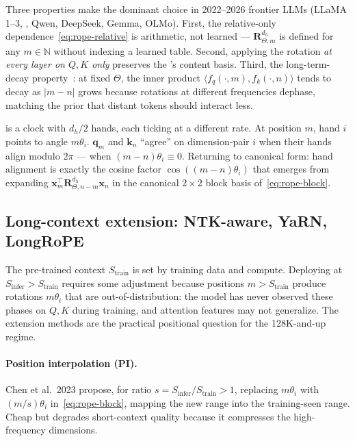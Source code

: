 Three properties make  the dominant choice in 2022--2026 frontier
 LLMs (LLaMA 1--3, , Qwen, DeepSeek, Gemma, OLMo).
First, the relative-only dependence~\eqref{eq:rope-relative} is
arithmetic, not learned --- $\boldsymbol{R}^{d_h}_{\Theta, m}$ is
defined for any $m \in \mathbb{N}$ without indexing a learned table.
Second, applying the rotation \emph{at every layer on $Q, K$ only}
preserves the 's content basis. Third, the
long-term-decay property~\citep[\S 3.3]{su2021}: at fixed $\Theta$, the
inner product $\langle f_q(\cdot, m), f_k(\cdot, n) \rangle$ tends to
decay as $|m-n|$ grows because rotations at different frequencies
dephase, matching the prior that distant tokens should interact less.

\begin{analogy}
 is a clock with $d_h/2$ hands, each ticking at a different rate.
At position $m$, hand $i$ points to angle $m\theta_i$.  $\boldsymbol{q}_m$
and  $\boldsymbol{k}_n$ ``agree'' on dimension-pair $i$ when their
hands align modulo $2\pi$ --- when $(m-n)\theta_i \equiv 0$. Returning
to canonical form: hand alignment is exactly the cosine factor
$\cos((m-n)\theta_i)$ that emerges from expanding
$\boldsymbol{x}_m^\top \boldsymbol{R}^{d_h}_{\Theta, n-m} \boldsymbol{x}_n$
in the canonical $2{\times}2$ block basis of~\eqref{eq:rope-block}.
\end{analogy}

\subsection{Long-context extension: NTK-aware, YaRN, LongRoPE}
\label{sec:pos-long-context}

The pre-trained context $S_{\text{train}}$ is set by training data and
compute. Deploying at $S_{\text{infer}} > S_{\text{train}}$ requires
some adjustment because positions $m > S_{\text{train}}$ produce
rotations $m\theta_i$ that are out-of-distribution: the model has
never observed these phases on $Q, K$ during training, and attention
features may not generalize. The extension methods are the practical
positional question for the 128K-and-up regime.

\paragraph{Position interpolation (PI).} Chen et al.\ 2023 propose,
for ratio $s = S_{\text{infer}} / S_{\text{train}} > 1$, replacing
$m\theta_i$ with $(m/s)\theta_i$ in~\eqref{eq:rope-block}, mapping the
new range into the training-seen
range. Cheap
but degrades short-context quality because it compresses the
high-frequency dimensions.

